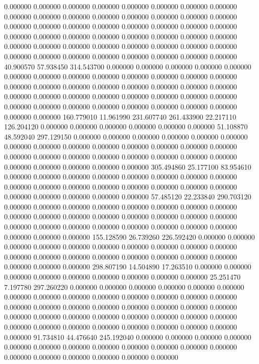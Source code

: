 0.000000 0.000000 0.000000
0.000000 0.000000 0.000000
0.000000 0.000000 0.000000
0.000000 0.000000 0.000000
0.000000 0.000000 0.000000
0.000000 0.000000 0.000000
0.000000 0.000000 0.000000
0.000000 0.000000 0.000000
0.000000 0.000000 0.000000
0.000000 0.000000 0.000000
0.000000 0.000000 0.000000
0.000000 0.000000 0.000000
0.000000 0.000000 0.000000
0.000000 0.000000 0.000000
0.000000 0.000000 0.000000
0.000000 0.000000 0.000000
40.900570 57.938450 314.543700
0.000000 0.000000 0.000000
0.000000 0.000000 0.000000
0.000000 0.000000 0.000000
0.000000 0.000000 0.000000
0.000000 0.000000 0.000000
0.000000 0.000000 0.000000
0.000000 0.000000 0.000000
0.000000 0.000000 0.000000
0.000000 0.000000 0.000000
0.000000 0.000000 0.000000
0.000000 0.000000 0.000000
0.000000 0.000000 0.000000
0.000000 0.000000 0.000000
160.779010 11.961990 231.607740
261.433900 22.217110 126.204120
0.000000 0.000000 0.000000
0.000000 0.000000 0.000000
51.108870 48.592040 297.129150
0.000000 0.000000 0.000000
0.000000 0.000000 0.000000
0.000000 0.000000 0.000000
0.000000 0.000000 0.000000
0.000000 0.000000 0.000000
0.000000 0.000000 0.000000
0.000000 0.000000 0.000000
0.000000 0.000000 0.000000
0.000000 0.000000 0.000000
305.494860 25.177100 83.954610
0.000000 0.000000 0.000000
0.000000 0.000000 0.000000
0.000000 0.000000 0.000000
0.000000 0.000000 0.000000
0.000000 0.000000 0.000000
0.000000 0.000000 0.000000
0.000000 0.000000 0.000000
57.485120 22.233840 290.703120
0.000000 0.000000 0.000000
0.000000 0.000000 0.000000
0.000000 0.000000 0.000000
0.000000 0.000000 0.000000
0.000000 0.000000 0.000000
0.000000 0.000000 0.000000
0.000000 0.000000 0.000000
0.000000 0.000000 0.000000
0.000000 0.000000 0.000000
155.128590 26.739260 226.592420
0.000000 0.000000 0.000000
0.000000 0.000000 0.000000
0.000000 0.000000 0.000000
0.000000 0.000000 0.000000
0.000000 0.000000 0.000000
0.000000 0.000000 0.000000
0.000000 0.000000 0.000000
298.807190 14.504890 17.263510
0.000000 0.000000 0.000000
0.000000 0.000000 0.000000
0.000000 0.000000 0.000000
25.251470 7.197780 297.260220
0.000000 0.000000 0.000000
0.000000 0.000000 0.000000
0.000000 0.000000 0.000000
0.000000 0.000000 0.000000
0.000000 0.000000 0.000000
0.000000 0.000000 0.000000
0.000000 0.000000 0.000000
0.000000 0.000000 0.000000
0.000000 0.000000 0.000000
0.000000 0.000000 0.000000
0.000000 0.000000 0.000000
0.000000 0.000000 0.000000
0.000000 0.000000 0.000000
91.734810 44.476640 245.192040
0.000000 0.000000 0.000000
0.000000 0.000000 0.000000
0.000000 0.000000 0.000000
0.000000 0.000000 0.000000
0.000000 0.000000 0.000000
0.000000 0.000000 0.000000
